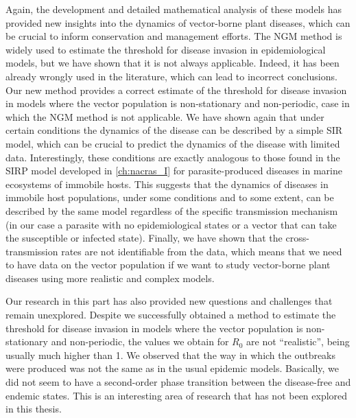 Again, the development and detailed mathematical analysis of these models has
provided new insights into the dynamics of vector-borne plant diseases, which
can be crucial to inform conservation and management efforts. The NGM method
is widely used to estimate the threshold for disease invasion in
epidemiological models, but we have shown that it is not always applicable.
Indeed, it has been already wrongly used in the literature, which can lead to
incorrect conclusions. Our new method provides a correct estimate of the
threshold for disease invasion in models where the vector population is
non-stationary and non-periodic, case in which the NGM method is not
applicable. We have shown again that under certain conditions the dynamics of
the disease can be described by a simple SIR model, which can be crucial to
predict the dynamics of the disease with limited data. Interestingly, these
conditions are exactly analogous to those found in the SIRP model developed in
\cref{ch:nacras_I} for parasite-produced diseases in marine ecosystems of
immobile hosts. This suggests that the dynamics of diseases in immobile host
populations, under some conditions and to some extent, can be described by the
same model regardless of the specific transmission mechanism (in our case a
parasite with no epidemiological states or a vector that can take the
susceptible or infected state). Finally, we have shown that the
cross-transmission rates are not identifiable from the data, which means that
we need to have data on the vector population if we want to study vector-borne
plant diseases using more realistic and complex models.

Our research in this part has also provided new questions and challenges that
remain unexplored. Despite we successfully obtained a method to estimate the
threshold for disease invasion in models where the vector population is
non-stationary and non-periodic, the values we obtain for $R_0$ are not
``realistic'', being usually much higher than 1. We observed that the way in
which the outbreaks were produced was not the same as in the usual epidemic
models. Basically, we did not seem to have a second-order phase transition
between the disease-free and endemic states. This is an interesting area of
research that has not been explored in this thesis.

